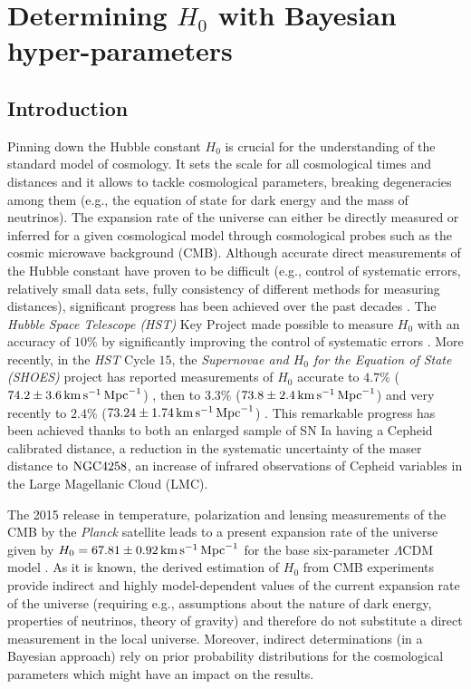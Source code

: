 \chapter{Determining $H_0$ with Bayesian hyper-parameters}
\label{chapter-h0}

\section{Introduction}
\label{chapter-h0:introduction}

Pinning down the Hubble constant $H_0$ is crucial for the understanding of the standard model of cosmology. It sets the scale for all cosmological times and distances and it allows to tackle cosmological parameters, breaking degeneracies among them (e.g., the equation of state for dark energy and the mass of neutrinos). The expansion rate of the universe can either be directly measured or inferred for a given cosmological model through cosmological probes such as the cosmic microwave background (CMB). Although accurate direct measurements of the Hubble constant have proven to be difficult (e.g., control of systematic errors, relatively small data sets, fully consistency of different methods for measuring distances), significant progress has been achieved  
over the past decades \cite{Freedman1996,Freedman:2010xv}. The \textit{Hubble Space Telescope (HST)} Key Project made possible to measure $H_0$ with an accuracy of $10\%$ by significantly improving the control of systematic errors \cite{Freedman2001}.  More recently, in the \textit{HST} Cycle $15$, the \textit{Supernovae and $H_0$ for the Equation of State (SHOES)} project has reported measurements of $H_0$ accurate to $4.7\%$ ($74.2 \pm 3.6 \, \mathrm{km}\, \mathrm{s}^{-1}\, \mathrm{Mpc}^{-1}$) \cite{Riess:2009pu}, then to $3.3\%$ ($73.8 \pm 2.4 \, \mathrm{km}\, \mathrm{s}^{-1}\, \mathrm{Mpc}^{-1}$) \cite{Riess:2011yx} and very recently to $2.4\%$ ($73.24 \pm 1.74 \, \mathrm{km}\, \mathrm{s}^{-1}\, \mathrm{Mpc}^{-1}$) \cite{Riess:2016jrr}. This remarkable progress has been achieved thanks to both an enlarged sample of SN Ia having a Cepheid calibrated distance, a reduction in the systematic uncertainty of the maser distance to $\mathrm{NGC4258}$, an increase of infrared observations of Cepheid variables in the Large Magellanic Cloud (LMC).  

The 2015 release in temperature, polarization and lensing measurements of the CMB by the \textit{Planck} satellite leads to a present expansion rate of the universe given by $H_0 = 67.81 \pm 0.92 \, \mathrm{km} \, \mathrm{s}^{-1}\, \mathrm{Mpc}^{-1}$ for the base six-parameter $\Lambda$CDM model \cite{Ade:2015xua}. As it is known, the derived estimation of $H_0$ from CMB experiments provide indirect and highly model-dependent values of the current expansion rate of the universe (requiring e.g., assumptions about the nature of dark energy, properties of neutrinos, theory of gravity) and therefore do not substitute a direct measurement in the local universe. Moreover, indirect determinations (in a Bayesian approach) rely on prior probability distributions for the cosmological parameters which might have an impact on the results.

